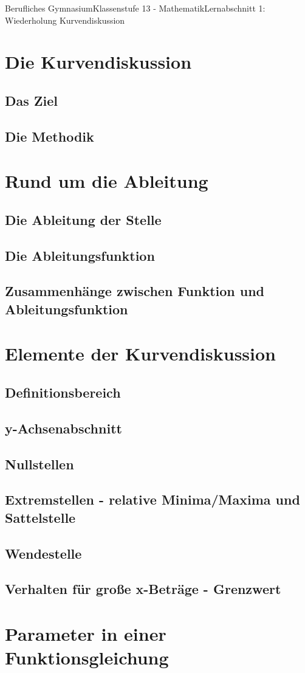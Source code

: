 \documentclass[11pt,twocolumn,oneside,openany,headings=optiontotoc,11pt,numbers=noenddot]{article}
\begin{document}
	\begin{worksheet}{Berufliches Gymnasium}{Klassenstufe 13 - Mathematik}{Lernabschnitt 1: Wiederholung Kurvendiskussion}
		\section{Die Kurvendiskussion}
		\subsection{Das Ziel}
		\subsection{Die Methodik}
		\section{Rund um die Ableitung}
		\subsection{Die Ableitung der Stelle}
		\subsection{Die Ableitungsfunktion}
		\subsection{Zusammenhänge zwischen Funktion und Ableitungsfunktion}
		\section{Elemente der Kurvendiskussion}
		\subsection{Definitionsbereich}
		\subsection{y-Achsenabschnitt}
		\subsection{Nullstellen}
		\subsection{Extremstellen - relative Minima/Maxima und Sattelstelle}
		\subsection{Wendestelle}
		\subsection{Verhalten für große x-Beträge - Grenzwert}
		\section{Parameter in einer Funktionsgleichung}
	\end{worksheet}
\end{document}
